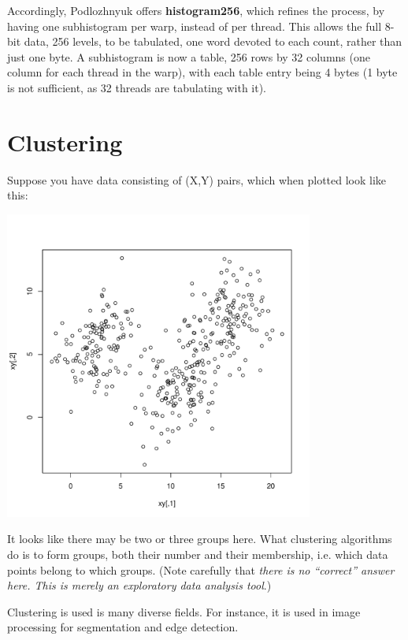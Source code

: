 Accordingly, Podlozhnyuk offers {\bf histogram256}, which refines the
process, by having one subhistogram per warp, instead of per thread.
This allows the full 8-bit data, 256 levels, to be tabulated, one word
devoted to each count, rather than just one byte.  A subhistogram is now
a table, 256 rows by 32 columns (one column for each thread in the
warp), with each table entry being 4 bytes (1 byte is not sufficient, as
32 threads are tabulating with it).

\section{Clustering}
\label{cluster}

Suppose you have data consisting of (X,Y) pairs, which when plotted look
like this:

\includegraphics[width=4.0in]{Images/Scatter.pdf}


It looks like there may be two or three groups here.  What clustering
algorithms do is to form groups, both their number and their membership,
i.e. which data points belong to which groups.  (Note carefully that
{\it there is no ``correct'' answer here.  This is merely an exploratory
data analysis tool}.)

Clustering is used is many diverse fields.  For instance, it is used in
image processing for segmentation and edge detection.

